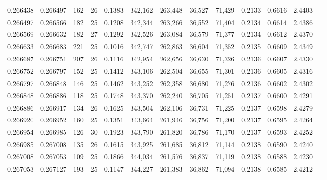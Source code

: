 \begin{tabular}{rrrrrrrrrrrrr}
0.266438 & 0.266497 &   162 &  26 &                                     0.1383 & 342,162 & 263,448 &  36,527 &  71,429 & 0.2133 & 0.6616 & 2.4403 \\
0.266497 & 0.266566 &   182 &  25 &                                     0.1208 & 342,344 & 263,266 &  36,552 &  71,404 & 0.2134 & 0.6614 & 2.4386 \\
0.266569 & 0.266632 &   182 &  27 &                                     0.1292 & 342,526 & 263,084 &  36,579 &  71,377 & 0.2134 & 0.6612 & 2.4370 \\
0.266633 & 0.266683 &   221 &  25 &                                     0.1016 & 342,747 & 262,863 &  36,604 &  71,352 & 0.2135 & 0.6609 & 2.4349 \\
0.266687 & 0.266751 &   207 &  26 &                                     0.1116 & 342,954 & 262,656 &  36,630 &  71,326 & 0.2136 & 0.6607 & 2.4330 \\
0.266752 & 0.266797 &   152 &  25 &                                     0.1412 & 343,106 & 262,504 &  36,655 &  71,301 & 0.2136 & 0.6605 & 2.4316 \\
0.266797 & 0.266848 &   146 &  25 &                                     0.1462 & 343,252 & 262,358 &  36,680 &  71,276 & 0.2136 & 0.6602 & 2.4302 \\
0.266848 & 0.266886 &   118 &  25 &                                     0.1748 & 343,370 & 262,240 &  36,705 &  71,251 & 0.2137 & 0.6600 & 2.4291 \\
0.266886 & 0.266917 &   134 &  26 &                                     0.1625 & 343,504 & 262,106 &  36,731 &  71,225 & 0.2137 & 0.6598 & 2.4279 \\
0.266920 & 0.266952 &   160 &  25 &                                     0.1351 & 343,664 & 261,946 &  36,756 &  71,200 & 0.2137 & 0.6595 & 2.4264 \\
0.266954 & 0.266985 &   126 &  30 &                                     0.1923 & 343,790 & 261,820 &  36,786 &  71,170 & 0.2137 & 0.6593 & 2.4252 \\
0.266985 & 0.267008 &   135 &  26 &                                     0.1615 & 343,925 & 261,685 &  36,812 &  71,144 & 0.2138 & 0.6590 & 2.4240 \\
0.267008 & 0.267053 &   109 &  25 &                                     0.1866 & 344,034 & 261,576 &  36,837 &  71,119 & 0.2138 & 0.6588 & 2.4230 \\
0.267053 & 0.267127 &   193 &  25 &                                     0.1147 & 344,227 & 261,383 &  36,862 &  71,094 & 0.2138 & 0.6585 & 2.4212 \\

\end{tabular}
